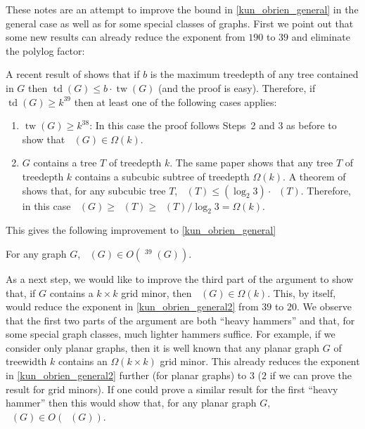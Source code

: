 \documentclass{patmorin}
\DeclareMathOperator{\tw}{tw}
\DeclareMathOperator{\td}{td}
\DeclareMathOperator{\chicen}{\chi_{\mathrm{cen}}}
\DeclareMathOperator{\chilin}{\chi_{\mathrm{lin}}}
\begin{document}
These notes are an attempt to improve the bound in \cref{kun_obrien_general} in the general case as well as for some special classes of graphs. First we point out that some new results can already reduce the exponent from $190$ to $39$ and eliminate the polylog factor:

A recent result of \citet[Theorem~1.4]{czerwinski.nadara.ea:improved} shows that if $b$ is the maximum treedepth of any tree contained in $G$ then $\td(G)\le b\cdot\tw(G)$ (and the proof is easy).  Therefore, if $\td(G)\ge k^39$ then at least one of the following cases applies:
\begin{enumerate}
    \item $\tw(G)\ge k^{38}$: In this case the proof follows Steps~2 and 3 as before to show that $\chilin(G)\in\Omega(k)$.
    \item $G$ contains a tree $T$ of treedepth $k$.  The same paper \cite[Lemma~1.6]{czerwinski.nadara.ea:improved} shows that any tree $T$ of treedepth $k$ contains a subcubic subtree of treedepth $\Omega(k)$.
    A theorem of \citet{kun.obrien.ea:polynomial} shows that, for any subcubic tree $T$, $\chicen(T) \le (\log_2 3)\cdot\chilin(T)$.  Therefore, in this case $\chilin(G)\ge\chilin(T)\ge \chicen(T)/\log_2 3 = \Omega(k)$.
\end{enumerate}

This gives the following improvement to \cref{kun_obrien_general}
\begin{thm}\label{kun_obrien_general2}
  For any graph $G$, $\chicen(G)\in O(\chilin^{39}(G))$.
\end{thm}



As a next step, we would like to improve the third part of the argument to show that, if $G$ contains a $k\times k$ grid minor, then $\chilin(G)\in \Omega(k)$.  This, by itself, would reduce the exponent in \cref{kun_obrien_general2} from $39$ to $20$.  We observe that the first two parts of the argument are both ``heavy hammers'' and that, for some special graph classes, much lighter hammers suffice.  For example, if we consider only planar graphs, then it is well known that any planar graph $G$ of treewidth $k$ contains an $\Omega(k\times k)$ grid minor.  This already reduces the exponent in \cref{kun_obrien_general2} further (for planar graphs) to $3$ ($2$ if we can prove the result for grid minors).  If one could prove a similar result for the first ``heavy hammer'' then this would show that, for any planar graph $G$, $\chicen(G)\in O(\chilin(G))$.
\end{document}
